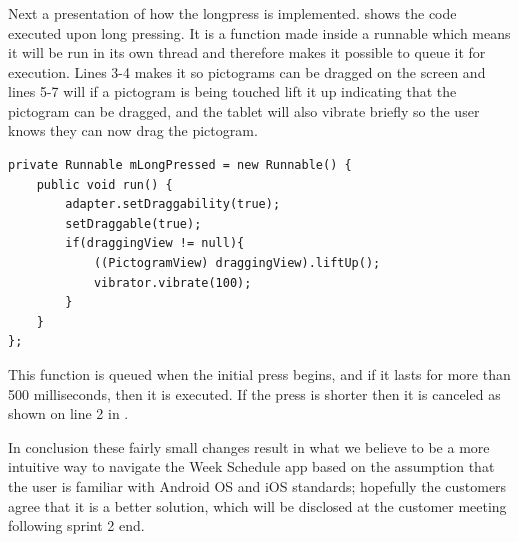 \subsubsection*{}

Next a presentation of how the longpress is implemented.
 shows the code executed upon long pressing.
It is a function made inside a runnable which means it will be run in its own thread and therefore makes it possible to queue it for execution. 
Lines 3-4 makes it so pictograms can be dragged on the screen and lines 5-7 will if a pictogram is being touched lift it up indicating that the pictogram can be dragged, and the tablet will also vibrate briefly so the user knows they can now drag the pictogram.

\begin{lstlisting}[floatplacement=h, caption={The longpress function which is queued upon a \texttt{MotionEvent\_Down}, i.e. a touch.}, label={lst:longpress}] 
private Runnable mLongPressed = new Runnable() {
    public void run() {
        adapter.setDraggability(true);
        setDraggable(true);
        if(draggingView != null){
            ((PictogramView) draggingView).liftUp();
            vibrator.vibrate(100);
        }
    }
};
\end{lstlisting}
This function is queued when the initial press begins, and if it lasts for more than 500 milliseconds, then it is executed. 
If the press is shorter then it is canceled as shown on line 2 in . 

\bigskip \noindent
In conclusion these fairly small changes result in what we believe to be a more intuitive way to navigate the Week Schedule app based on the assumption that the user is familiar with Android OS and iOS standards; hopefully the customers agree that it is a better solution, which will be disclosed at the customer meeting following sprint 2 end.